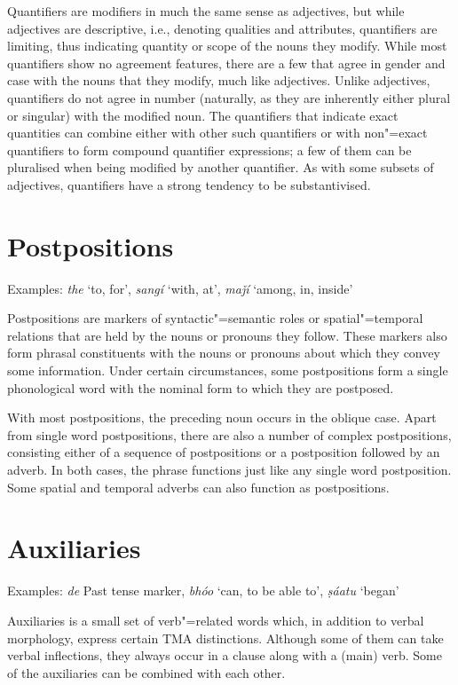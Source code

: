 Quantifiers are modifiers in much the same sense as adjectives, but while adjectives are descriptive, i.e., denoting qualities and attributes, quantifiers are limiting, thus indicating quantity or scope of the nouns they modify. While most quantifiers show no agreement features, there are a few that agree in gender and case with the nouns that they modify, much like adjectives. Unlike adjectives, quantifiers do not agree in number (naturally, as they are inherently either plural or singular) with the modified noun. The quantifiers that indicate exact quantities can combine either with other such quantifiers or with non"=exact quantifiers to form compound quantifier expressions; a few of them can be pluralised when being modified by another quantifier. As with some subsets of adjectives, quantifiers have a strong tendency to be substantivised.


\section{Postpositions}
\label{sec:3b-9}
Examples: \textit{the} `to, for', \textit{sangí} `with, at', \textit{maǰí} `among, in, inside'


Postpositions are markers of syntactic"=semantic roles or spatial"=temporal relations that are held by the nouns or pronouns they follow. These markers also form phrasal constituents with the nouns or pronouns about which they convey some information. Under certain circumstances, some postpositions form a single phonological word with the nominal form to which they are postposed.  


With most postpositions, the preceding noun occurs in the oblique case. Apart from single word postpositions, there are also a number of complex postpositions, consisting either of a sequence of postpositions or a postposition followed by an adverb. In both cases, the phrase functions just like any single word postposition. Some spatial and temporal adverbs can also function as postpositions.


\section{Auxiliaries}
\label{sec:3b-10}
Examples: \textit{de} Past tense marker, \textit{bhóo} `can, to be able to', \textit{ṣáatu} `began'


Auxiliaries is a small set of verb"=related words which, in addition to verbal morphology, express certain TMA distinctions. Although some of them can take verbal inflections, they always occur in a clause along with a (main) verb. Some of the auxiliaries can be combined with each other.


